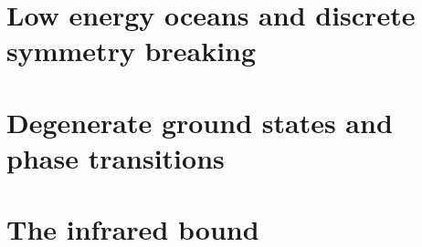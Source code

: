 \chapter{Low energy oceans and discrete symmetry breaking}





\chapter{Degenerate ground states and phase transitions}




\chapter{The infrared bound}



